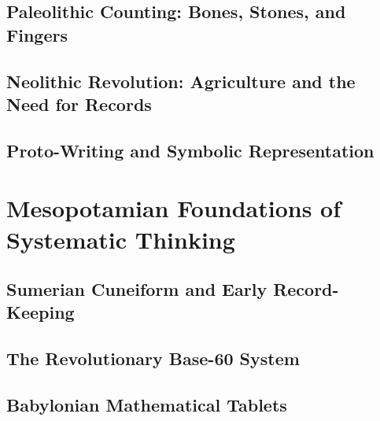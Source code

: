 \documentclass[12pt, oneside, openany]{book}
\begin{document}
\section{Paleolithic Counting: Bones, Stones, and Fingers}

\section{Neolithic Revolution: Agriculture and the Need for Records}

\section{Proto-Writing and Symbolic Representation}


\chapter{Mesopotamian Foundations of Systematic Thinking}

\section{Sumerian Cuneiform and Early Record-Keeping}

\section{The Revolutionary Base-60 System}

\section{Babylonian Mathematical Tablets}
\end{document}
